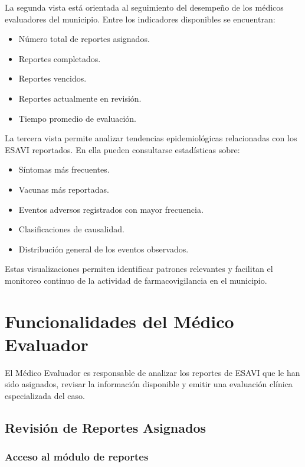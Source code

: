\documentclass[12pt,a4paper]{report}
\begin{document}
La segunda vista está orientada al seguimiento del desempeño de los médicos evaluadores del municipio. Entre los indicadores disponibles se encuentran:

\begin{itemize}
\item Número total de reportes asignados.
\item Reportes completados.
\item Reportes vencidos.
\item Reportes actualmente en revisión.
\item Tiempo promedio de evaluación.
\end{itemize}

La tercera vista permite analizar tendencias epidemiológicas relacionadas con los ESAVI reportados. En ella pueden consultarse estadísticas sobre:

\begin{itemize}
\item Síntomas más frecuentes.
\item Vacunas más reportadas.
\item Eventos adversos registrados con mayor frecuencia.
\item Clasificaciones de causalidad.
\item Distribución general de los eventos observados.
\end{itemize}

Estas visualizaciones permiten identificar patrones relevantes y facilitan el monitoreo continuo de la actividad de farmacovigilancia en el municipio.



\chapter{Funcionalidades del Médico Evaluador}

El Médico Evaluador es responsable de analizar los reportes de ESAVI que le han sido asignados, revisar la información disponible y emitir una evaluación clínica especializada del caso.

\section{Revisión de Reportes Asignados}

\subsection{Acceso al módulo de reportes}
\end{document}
